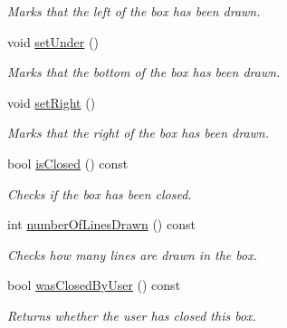 \begin{DoxyCompactItemize}
\begin{DoxyCompactList}\small\item\em \-Marks that the left of the box has been drawn. \end{DoxyCompactList}\item 
\hypertarget{classBox_ac414cf1641426051411c9c80d24906e8}{void \hyperlink{classBox_ac414cf1641426051411c9c80d24906e8}{set\-Under} ()}\label{classBox_ac414cf1641426051411c9c80d24906e8}

\begin{DoxyCompactList}\small\item\em \-Marks that the bottom of the box has been drawn. \end{DoxyCompactList}\item 
\hypertarget{classBox_a7fb35863d54190760a80fd7acd480436}{void \hyperlink{classBox_a7fb35863d54190760a80fd7acd480436}{set\-Right} ()}\label{classBox_a7fb35863d54190760a80fd7acd480436}

\begin{DoxyCompactList}\small\item\em \-Marks that the right of the box has been drawn. \end{DoxyCompactList}\item 
bool \hyperlink{classBox_a1489f102d7527122535a5e94a5e91a15}{is\-Closed} () const 
\begin{DoxyCompactList}\small\item\em \-Checks if the box has been closed. \end{DoxyCompactList}\item 
int \hyperlink{classBox_a34d0b328ebbd1add43f66dbe6c0c205e}{number\-Of\-Lines\-Drawn} () const 
\begin{DoxyCompactList}\small\item\em \-Checks how many lines are drawn in the box. \end{DoxyCompactList}\item 
bool \hyperlink{classBox_a9f6699ac0342d013c2d518896d921e19}{was\-Closed\-By\-User} () const 
\begin{DoxyCompactList}\small\item\em \-Returns whether the user has closed this box. \end{DoxyCompactList}\end{DoxyCompactItemize}


